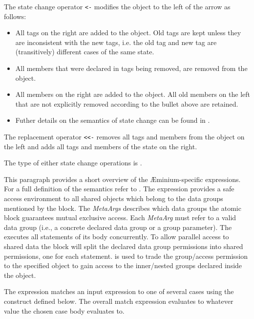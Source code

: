The state change operator \texttt{<-} modifies the object to the left of the
arrow as follows:

\begin{itemize}

\item
All tags on the right are added to the object.  Old tags are kept
unless they are inconsistent with the new tags, i.e. the old tag and
new tag are (transitively) different cases of the same state.

\item
All members that were declared in tags being removed, are removed from
the object.

\item
All members on the right are added to the object.  All old members on
the left that are not explicitly removed according to the bullet
above are retained.  

\item 
Futher details on the semantics of state change can be found in \citet{sunshine2011}.

\end{itemize}

The replacement operator \texttt{<{}<-} removes all tags and members from the object on the left and adds all tags and members of the state on the right.   

The type of either state change operations is .

This paragraph provides a short overview of the \AE{}minium-specific
expressions. For a full definition of the semantics refer to
\cite{stork09:concurrency_by_default, stork10:uaeminium_spec}.  The
 expression provides a safe access environment to all
shared objects which belong to the data groups mentioned by the
 block. The \emph{MetaArgs} describes which data groups
the atomic block guarantees mutual exclusive access. Each
\emph{MetaArg} must refer to a valid data group (i.e., a concrete
declared data group or a group parameter).  The  executes
all statements of its body concurrently. To allow parallel access to
shared data the  block will split the declared data group
permissions into shared permissions, one for each statement.  
 is used to trade the group/access permission to the
specified object to gain access to the inner/nested groups declared
inside the object.

The  expression matches an input expression to one of
several cases using the  construct defined below.
The overall match expression evaluates to whatever value the
chosen case body evaluates to.

